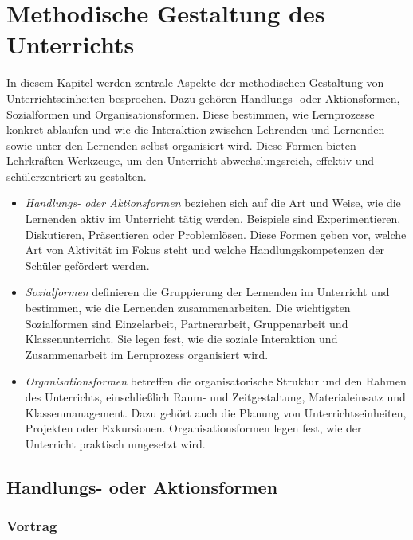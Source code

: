 \chapter{Methodische Gestaltung des Unterrichts}\label{Methoden}

In diesem Kapitel werden zentrale Aspekte der methodischen Gestaltung von Unterrichtseinheiten besprochen. Dazu geh\"{o}ren Handlungs- oder Aktionsformen, Sozialformen und Organisationsformen. Diese bestimmen, wie Lernprozesse konkret ablaufen und wie die Interaktion zwischen Lehrenden und Lernenden sowie unter den Lernenden selbst organisiert wird. Diese Formen bieten Lehrkr\"{a}ften Werkzeuge, um den Unterricht abwechslungsreich, effektiv und sch\"{u}lerzentriert zu gestalten.

\begin{itemize}
\item
\emph{Handlungs- oder Aktionsformen}  beziehen sich auf die Art und Weise, wie die Lernenden aktiv im Unterricht t\"{a}tig werden. Beispiele sind Experimentieren, Diskutieren, Pr\"{a}sentieren oder Probleml\"{o}sen. Diese Formen geben vor, welche Art von Aktivit\"{a}t im Fokus steht und welche Handlungskompetenzen der Sch\"{u}ler gef\"{o}rdert werden.
\item
\emph{Sozialformen} definieren die Gruppierung der Lernenden im Unterricht und bestimmen, wie die Lernenden zusammenarbeiten. Die wichtigsten Sozialformen sind Einzelarbeit, Partnerarbeit, Gruppenarbeit und Klassenunterricht. Sie legen fest, wie die soziale Interaktion und Zusammenarbeit im Lernprozess organisiert wird.
\item
\emph{Organisationsformen} betreffen die organisatorische Struktur und den Rahmen des Unterrichts, einschlie{\ss}lich Raum- und Zeitgestaltung, Materialeinsatz und Klassenmanagement. Dazu geh\"{o}rt auch die Planung von Unterrichtseinheiten, Projekten oder Exkursionen. Organisationsformen legen fest, wie der Unterricht praktisch umgesetzt wird.
\end{itemize}

\bip\bip
\section{Handlungs- oder Aktionsformen}

\subsection{Vortrag}

